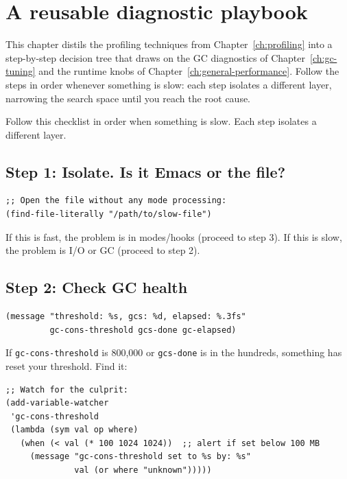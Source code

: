 \chapter{A reusable diagnostic playbook}
\label{ch:diagnostic-playbook}
\minitoc\label{a-reusable-diagnostic-playbook}

This chapter distils the profiling techniques from
Chapter~\ref{ch:profiling} into a step-by-step decision tree
that draws on the GC diagnostics of Chapter~\ref{ch:gc-tuning} and
the runtime knobs of Chapter~\ref{ch:general-performance}.
Follow the steps in order whenever something is slow: each step
isolates a different layer, narrowing the search space until you
reach the root cause.

Follow this checklist in order when something is slow. Each step isolates a different layer.

\section{Step 1: Isolate. Is it Emacs or the file?}\label{step-1-isolate-is-it-emacs-or-the-file}

\begin{verbatim}
;; Open the file without any mode processing:
(find-file-literally "/path/to/slow-file")
\end{verbatim}

If this is fast, the problem is in modes/hooks (proceed to step 3). If this is slow, the problem is I/O or GC (proceed to step 2).

\section{Step 2: Check GC health}\label{step-2-check-gc-health}

\begin{verbatim}
(message "threshold: %s, gcs: %d, elapsed: %.3fs"
         gc-cons-threshold gcs-done gc-elapsed)
\end{verbatim}

If \texttt{gc-cons-threshold} is 800,000 or \texttt{gcs-done} is in the hundreds, something has reset your threshold. Find it:

\begin{verbatim}
;; Watch for the culprit:
(add-variable-watcher
 'gc-cons-threshold
 (lambda (sym val op where)
   (when (< val (* 100 1024 1024))  ;; alert if set below 100 MB
     (message "gc-cons-threshold set to %s by: %s"
              val (or where "unknown")))))
\end{verbatim}

